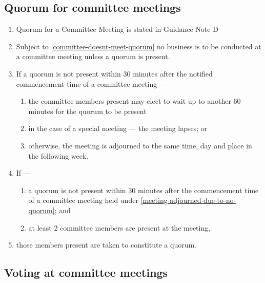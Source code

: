 \documentclass[../constitution.tex]{subfiles}
\begin{document}
\hypertarget{quorum-for-committee-meetings}{%
\subsection{Quorum for committee meetings}\label{quorum-for-committee-meetings}}

\begin{enumerate}

\item Quorum for a Committee Meeting is stated in Guidance Note D 
\item Subject to  \ref{committee-doesnt-meet-quorum} no business is to be conducted at a committee meeting unless a quorum is present.
\item If a quorum is not present within 30 minutes after the notified commencement time of a committee meeting --- \label{no-quorum-after-30min}

  \begin{enumerate}
  
  \item the committee members present may elect to wait up to another 60 minutes for the quorum to be present 
  \item in the case of a special meeting --- the meeting lapses; or
  \item otherwise, the meeting is adjourned to the same time, day and place in the following week. \label{meeting-adjourned-due-to-no-quorum}
  \end{enumerate}
\item If ---

  \begin{enumerate}
  
  \item a quorum is not present within 30 minutes after the commencement time of a committee meeting held under  \ref{meeting-adjourned-due-to-no-quorum}; and
  \item at least 2 committee members are present at the meeting,
  \end{enumerate}
\item those members present are taken to constitute a quorum.
\end{enumerate}

\hypertarget{voting-at-committee-meetings}{%
\subsection{Voting at committee meetings}\label{voting-at-committee-meetings}}
\end{document}
